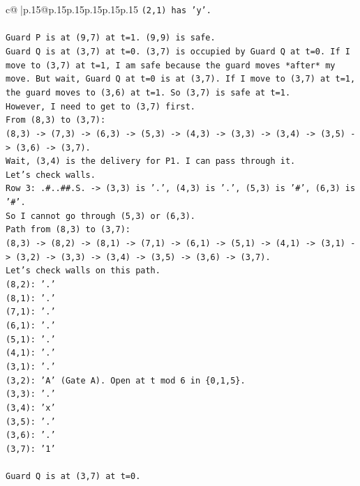 \documentclass{article}
\begin{document}
{\begin{supertabular}{c@{$\;$}|p{.15\linewidth}@{}p{.15\linewidth}p{.15\linewidth}p{.15\linewidth}p{.15\linewidth}p{.15\linewidth}}
{{{\texttt{(2,1) has 'y'.} \\
\\ 
\texttt{Guard P is at (9,7) at t=1. (9,9) is safe.} \\
\texttt{Guard Q is at (3,7) at t=0. (3,7) is occupied by Guard Q at t=0. If I move to (3,7) at t=1, I am safe because the guard moves *after* my move. But wait, Guard Q at t=0 is at (3,7). If I move to (3,7) at t=1, the guard moves to (3,6) at t=1. So (3,7) is safe at t=1.} \\
\texttt{However, I need to get to (3,7) first.} \\
\texttt{From (8,3) to (3,7):} \\
\texttt{(8,3) {-}> (7,3) {-}> (6,3) {-}> (5,3) {-}> (4,3) {-}> (3,3) {-}> (3,4) {-}> (3,5) {-}> (3,6) {-}> (3,7).} \\
\texttt{Wait, (3,4) is the delivery for P1. I can pass through it.} \\
\texttt{Let's check walls.} \\
\texttt{Row 3: .\#..\#\#.S. {-}> (3,3) is '.', (4,3) is '.', (5,3) is '\#', (6,3) is '\#'.} \\
\texttt{So I cannot go through (5,3) or (6,3).} \\
\texttt{Path from (8,3) to (3,7):} \\
\texttt{(8,3) {-}> (8,2) {-}> (8,1) {-}> (7,1) {-}> (6,1) {-}> (5,1) {-}> (4,1) {-}> (3,1) {-}> (3,2) {-}> (3,3) {-}> (3,4) {-}> (3,5) {-}> (3,6) {-}> (3,7).} \\
\texttt{Let's check walls on this path.} \\
\texttt{(8,2): '.'} \\
\texttt{(8,1): '.'} \\
\texttt{(7,1): '.'} \\
\texttt{(6,1): '.'} \\
\texttt{(5,1): '.'} \\
\texttt{(4,1): '.'} \\
\texttt{(3,1): '.'} \\
\texttt{(3,2): 'A' (Gate A). Open at t mod 6 in \{0,1,5\}.} \\
\texttt{(3,3): '.'} \\
\texttt{(3,4): 'x'} \\
\texttt{(3,5): '.'} \\
\texttt{(3,6): '.'} \\
\texttt{(3,7): '1'} \\
\\ 
\texttt{Guard Q is at (3,7) at t=0.} \\
}}}
\end{supertabular}}
\end{document}
